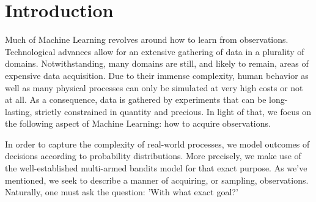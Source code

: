 \newcommand{\package}{\emph}

\chapter{Introduction}


Much of Machine Learning revolves around how to learn from observations.
Technological advances allow for an extensive gathering of data in a plurality
of domains. Notwithstanding, many domains are still, and likely to remain, areas
of expensive data acquisition. Due to their immense complexity, human behavior
as well as many physical processes can only be simulated at very high costs or
not at all. As a consequence, data is gathered by experiments that can be
long-lasting, strictly constrained in quantity and precious. In light of that,
we focus on the following aspect of Machine Learning: how to acquire
observations.

In order to capture the complexity of real-world processes, we model outcomes of
decisions according to probability distributions. More precisely, we make use of
the well-established multi-armed bandits model for that exact purpose. As we've
mentioned, we seek to describe a manner of acquiring, or sampling, observations.
Naturally, one must ask the question: 'With what exact goal?'

